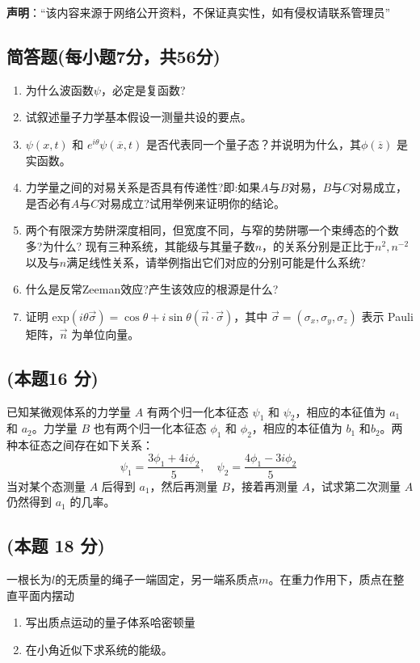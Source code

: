 
\textbf{声明}：“该内容来源于网络公开资料，不保证真实性，如有侵权请联系管理员”

\subsection{简答题(每小题7分，共56分)}
\begin{enumerate}
\item 为什么波函数$\psi$，必定是复函数?
\item 试叙述量子力学基本假设一测量共设的要点。
\item $\psi(x,t)$ 和 $e^{i\theta}\psi(\overline x,t)$ 是否代表同一个量子态？并说明为什么，其$\phi(\overline z)$ 是实函数。
\item 力学量之间的对易关系是否具有传递性?即:如果$A$与$B$对易，$B$与$C$对易成立，是否必有$A$与$C$对易成立?试用举例来证明你的结论。
\item 两个有限深方势阱深度相同，但宽度不同，与窄的势阱哪一个束缚态的个数多?为什么?
现有三种系统，其能级与其量子数$n$，的关系分别是正比于$n^2,n^{-2}$以及与$n$满足线性关系，请举例指出它们对应的分别可能是什么系统?
\item 什么是反常Zeeman效应?产生该效应的根源是什么?
\item 证明 $\text{exp}(i\theta \vec{\sigma}) = \cos \theta + i \sin \theta (\vec{n} \cdot \vec{\sigma})$，其中 $\vec{\sigma} = (\sigma_x, \sigma_y, \sigma_z)$ 表示 Pauli 矩阵，$\vec{n}$ 为单位向量。
\end{enumerate}
\subsection{(本题16 分)}
已知某微观体系的力学量 $A$ 有两个归一化本征态 $\psi_1$ 和 $\psi_2$，相应的本征值为 $a_1$ 和 $a_2$。力学量 $B$ 也有两个归一化本征态 $\phi_1$ 和 $\phi_2$，相应的本征值为 $b_1$ 和$b_2$。两种本征态之间存在如下关系：
$$\psi_1 = \frac{3\phi_1 + 4i\phi_2}{5}, \quad \psi_2 = \frac{4\phi_1 - 3i\phi_2}{5}~$$
当对某个态测量 $A$ 后得到 $a_1$，然后再测量 $B$，接着再测量 $A$，试求第二次测量 $A$ 仍然得到 $a_1$ 的几率。
\subsection{(本题 18 分)}
一根长为$l$的无质量的绳子一端固定，另一端系质点$m$。在重力作用下，质点在整直平面内摆动
\begin{enumerate}
\item 写出质点运动的量子体系哈密顿量
\item 在小角近似下求系统的能级。
\end{enumerate}
